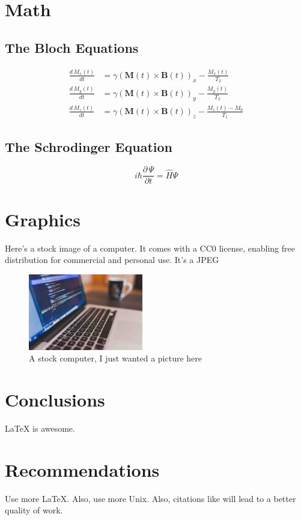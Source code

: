 \documentclass{workreport}
\begin{document}
\begin{body}
\section{Math}

\lipsum[1]

\subsection{The Bloch Equations}

	\begin{align}
		\frac{d\, M_x(t)}{dt} &= \gamma(\mathbf{M}(t) \times \mathbf{B}(t))_x - \frac{M_x(t)}{T_2} \\
		\frac{d\, M_y(t)}{dt} &= \gamma(\mathbf{M}(t) \times \mathbf{B}(t))_y - \frac{M_y(t)}{T_2} \\
		\frac{d\, M_z(t)}{dt} &= \gamma(\mathbf{M}(t) \times \mathbf{B}(t))_z - \frac{M_z(t) - M_0}{T_1}
	\end{align}

\subsection{The Schrodinger Equation}

	\begin{equation}
		i\hbar \frac{\partial \, \Psi}{\partial t} = \hat{H}\Psi
	\end{equation}

\section{Graphics}
    Here's a stock image of a computer. It comes with a CC0 license, enabling
    free distribution for commercial and personal use. It's a JPEG

    \begin{figure}[!ht]
    	\centering
        \label{fig:stock_computer}
        \includegraphics[width=5cm]{./stock-image.jpg}
        \caption{A stock computer, I just wanted a picture here}
    \end{figure}

\section{Conclusions}
	\gls{LaTeX} is awesome.

\section{Recommendations}

	Use more \LaTeX. Also, use more \gls{Unix}. Also, citations like
    \cite{schweiger_principles_2001} will lead to a better quality of work.

\end{body}
\end{document}
